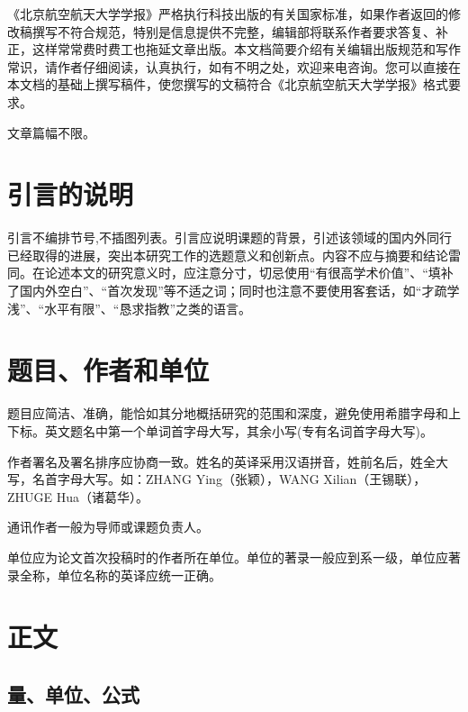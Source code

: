 \documentclass[10.5pt,twocolumn]{jbuaa}
\begin{document}
 《北京航空航天大学学报》严格执行科技出版的有关国家标准，如果作者返回的修改稿撰写不符合规范，特别是信息提供不完整，编辑部将联系作者要求答复、补正，这样常常费时费工也拖延文章出版。本文档简要介绍有关编辑出版规范和写作常识，请作者仔细阅读，认真执行，如有不明之处，欢迎来电咨询。您可以直接在本文档的基础上撰写稿件，使您撰写的文稿符合《北京航空航天大学学报》格式要求。\enlargethispage{-3.3cm}
 
 文章篇幅不限。
 
 \section{引言的说明}
 引言不编排节号,不插图列表。引言应说明课题的背景，引述该领域的国内外同行已经取得的进展，突出本研究工作的选题意义和创新点。内容不应与摘要和结论雷同。在论述本文的研究意义时，应注意分寸，切忌使用“有很高学术价值”、“填补了国内外空白”、“首次发现”等不适之词；同时也注意不要使用客套话，如“才疏学浅”、“水平有限”、“恳求指教”之类的语言。
 
 \section{题目、作者和单位}
 \enlargethispage{-3.3cm}
 题目应简洁、准确，能恰如其分地概括研究的范围和深度，避免使用希腊字母和上下标。英文题名中第一个单词首字母大写，其余小写(专有名词首字母大写)。
 
 作者署名及署名排序应协商一致。姓名的英译采用汉语拼音，姓前名后，姓全大写，名首字母大写。如：ZHANG Ying（张颖），WANG Xilian（王锡联），ZHUGE Hua（诸葛华）。
 
 通讯作者一般为导师或课题负责人。
 
 单位应为论文首次投稿时的作者所在单位。单位的著录一般应到系一级，单位应著录全称，单位名称的英译应统一正确。
 
 \section{正文}
 \subsection{量、单位、公式}
\end{document}
